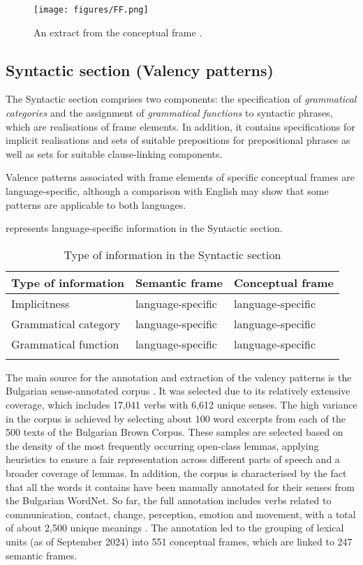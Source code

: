 \documentclass[output=paper,colorlinks,citecolor=brown]{langscibook}
\begin{document}
\begin{figure}[ht]
  \texttt{[image: figures/FF.png]}
  \caption{An extract from the conceptual frame .}
  \label{fig:FF}
\end{figure}


\subsection{Syntactic section (Valency patterns)}

The Syntactic section comprises two components: the specification of \emph{grammatical categories} and the assignment of \emph{grammatical functions} to syntactic phrases, which are realisations of frame elements. In addition, it contains specifications for implicit realisations and sets of suitable prepositions for prepositional phrases as well as sets for suitable clause-linking components.

Valence patterns associated with frame elements of specific conceptual frames are language-specific, although a comparison with English may show that some patterns are applicable to both languages.

 represents language-specific information in the Syntactic section.

\begin{table}
    \centering
    \begin{tabular}{lll}
    \lsptoprule
      Type of information & Semantic frame  & Conceptual frame  \\\midrule
      Implicitness & language-specific & language-specific\\
      Grammatical category & language-specific & language-specific\\
      Grammatical function & language-specific & language-specific\\
      \lspbottomrule
    \end{tabular}
    \caption{Type of information in the Syntactic section}
     \label{tab:my_label6}
  \end{table}  

The main source for the annotation and extraction of the valency patterns is the Bulgarian sense-annotated corpus \citep{2012-Bulgarian-Sense-annotated}. It was selected due to its relatively extensive coverage, which includes 17,041 verbs with 6,612 unique senses. The high variance in the corpus is achieved by selecting about 100 word excerpts from each of the 500 texts of the Bulgarian Brown Corpus. These samples are selected based on the density of the most frequently occurring open-class lemmas, applying heuristics to ensure a fair representation across different parts of speech and a broader coverage of lemmas. In addition, the corpus is characterised by the fact that all the words it contains have been manually annotated for their senses from the Bulgarian WordNet. So far, the full annotation includes verbs related to communication, contact, change, perception, emotion and movement, with a total of about 2,500 unique meanings \citep{skoeva2024}. The annotation led to the grouping of lexical units (as of September 2024) into 551 conceptual frames, which are linked to 247 semantic frames.
\end{document}
